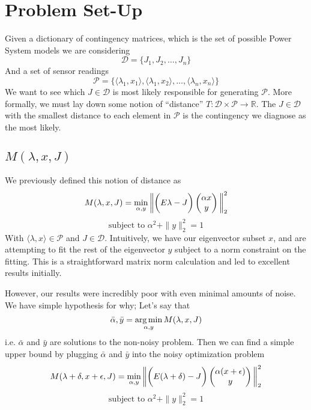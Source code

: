 \section{Problem Set-Up}
Given a dictionary of contingency matrices, which is the set of possible Power System models we are considering
$$ \mathcal{D} =  \{ J_1, J_2, \dots, J_n \} $$
And a set of sensor readings 
$$ \mathcal{P} =  \{ \langle \lambda_1,x_1 \rangle, \langle \lambda_1,x_2 \rangle, \dots, \langle \lambda_n,x_n \rangle \} $$
We want to see which $J \in \mathcal{D}$ is most likely responsible for generating $\mathcal{P}$. More formally, 
we must lay down some notion of ``distance'' $T: \mathcal{D} \times \mathcal{P} \rightarrow \mathbb{R}$. The $J \in \mathcal{D}$ with the smallest distance to each element in $\mathcal{P}$ is the contingency we diagnose as the most likely. 
\subsection{$M(\lambda, x, J)$}
We previously defined this notion of distance as
\begin{equation}
M(\lambda, x, J) = \min_{\alpha, y} \bigg{ \| } \bigg{(}E {\lambda} - J\bigg{)}
\begin{pmatrix}
\alpha x \\
y
\end{pmatrix}
     \bigg{ \| }_2^2
\end{equation}
$$ \text{subject to } \alpha^2 + \|y\|_2^2 = 1$$
 With 
$\langle \lambda,x \rangle \in \mathcal{P}$ and $J \in \mathcal{D}$. Intuitively, we have our eigenvector subset $x$, and are attempting to fit the rest of the eigenvector $y$ subject to a norm constraint on the fitting. This is a straightforward matrix norm calculation and led to excellent results initially. 

However, our results were incredibly poor with even minimal amounts of noise. We have simple hypothesis for why; Let's say that $$\bar{\alpha}, \bar{y} = \operatorname*{arg\,min}_{\alpha,y} M(\lambda, x, J)$$ i.e. $\bar{\alpha}$ and $\bar{y}$ are solutions to the non-noisy problem. 
 Then we can find a simple upper bound by plugging $\bar{\alpha}$ and $\bar{y}$ into the noisy optimization problem
\begin{equation}
M(\lambda + \delta, x + \epsilon, J) = \min_{\alpha, y} \bigg{ \| } \bigg{(}E (\lambda + \delta) - J\bigg{)}
\begin{pmatrix}
\alpha (x + \epsilon) \\
y
\end{pmatrix}
     \bigg{ \| }_2^2
\end{equation}
$$ \text{subject to } \alpha^2 + \|y\|_2^2 = 1$$


